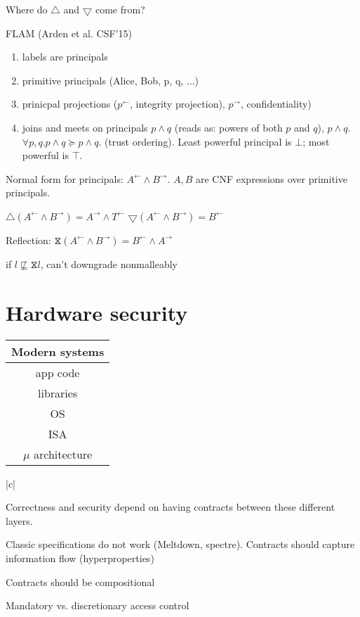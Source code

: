 \documentclass{article}
\newcommand{\la}{^{\leftarrow}}
\newcommand{\ra}{^{\rightarrow}}
\newcommand{\refl}{\hourglass}
\begin{document}
Where do $\bigtriangleup$ and $\bigtriangledown$ come from?

FLAM (Arden et al. CSF'15)

\begin{enumerate}
    \item labels are principals
    \item primitive principals (Alice, Bob, p, q, $\ldots$)
    \item prinicpal projections ($p^{\leftarrow}$, integrity projection), $p^{\rightarrow}$, confidentiality)
    \item joins and meets on principals $p \land q$ (reads as: powers of both $p$ and $q$), $p \wedge q$. $\forall p,q. p \land q \succeq p \wedge q$. (trust ordering). Least powerful principal is $\bot$; most powerful is $\top$. %
\end{enumerate}

Normal form for principals: $A^{\leftarrow} \land B^{\rightarrow}$.
$A,B$ are CNF expressions over primitive principals.

$\bigtriangleup (A \la \land B \ra) = A \ra \land T \la$
$\bigtriangledown (A \la \land B \ra) = B \la$

Reflection: $ \refl (A \la \land B \ra) = B \la \land A \ra$

if $l \not\sqsubseteq \refl l$, can't downgrade nonmalleably

\section{Hardware security}
\begin{tabular}{|c|}
Modern systems \\
\hline
app code \\
\hline
libraries \\ 
\hline
OS \\
\hline
ISA \\ 
\hline
$\mu$ architecture \\
\end{tabular}{|c|}

Correctness and security depend on having contracts between these different layers. 

Classic specifications do not work (Meltdown, spectre). Contracts should capture information flow (hyperproperties)

Contracts should be compositional

Mandatory vs. discretionary access control
\end{document}
